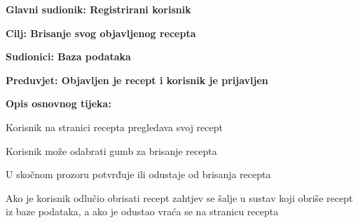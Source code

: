 				\noindent {}
				\begin{packed_item}
					
					\item \textbf{Glavni sudionik: Registrirani korisnik}
					\item  \textbf{Cilj: Brisanje svog objavljenog recepta} 
					\item  \textbf{Sudionici: Baza podataka} 
					\item  \textbf{Preduvjet: Objavljen je recept i korisnik je prijavljen} 
					\item  \textbf{Opis osnovnog tijeka:}
					
					\item[] \begin{packed_enum}
						
						\item Korisnik na stranici recepta pregledava svoj recept
						\item Korisnik može odabrati gumb za brisanje recepta
						\item U skočnom prozoru potvrđuje ili odustaje od brisanja recepta 
						\item Ako je korisnik odlučio obrisati recept zahtjev se šalje u sustav koji obriše recept iz baze podataka, a ako je odustao vraća se na stranicu recepta
						
					\end{packed_enum}
				\end{packed_item}
				
